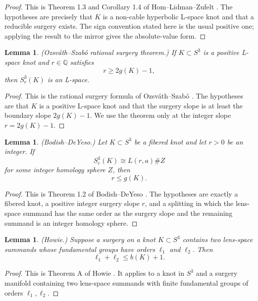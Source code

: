 \documentclass[12pt]{article}
\newtheorem{lemma}[theorem]{Lemma}
\theoremstyle{definition}
\begin{document}
\begin{proof}
This is Theorem 1.3 and Corollary 1.4 of Hom--Lidman--Zufelt \cite{HLZ}.  The hypotheses are precisely that \(K\) is a non-cable hyperbolic L-space knot and that a reducible surgery exists.  The sign convention stated here is the usual positive one; applying the result to the mirror gives the absolute-value form.
\end{proof}

\begin{lemma}\label{lem:OSz-lspace-slope}
(Ozsváth--Szabó rational surgery theorem.)  If \(K\subset S^3\) is a positive L-space knot and \(r\in\mathbb{Q}\) satisfies
\[
r\ge 2g(K)-1,
\]
then \(S^3_r(K)\) is an L-space.
\end{lemma}

\begin{proof}
This is the rational surgery formula of Ozsváth--Szabó \cite{OSzRat}.  The hypotheses are that \(K\) is a positive L-space knot and that the surgery slope is at least the boundary slope \(2g(K)-1\).  We use the theorem only at the integer slope \(r=2g(K)-1\).
\end{proof}

\begin{lemma}\label{lem:bodish-deyeso}
(Bodish--DeYeso.)  Let \(K\subset S^3\) be a fibered knot and let \(r>0\) be an integer.  If
\[
S^3_r(K)\cong L(r,a)\# Z
\]
for some integer homology sphere \(Z\), then
\[
r\le g(K).
\]
\end{lemma}

\begin{proof}
This is Theorem 1.2 of Bodish--DeYeso \cite{BodishDeYeso}.  The hypotheses are exactly a fibered knot, a positive integer surgery slope \(r\), and a splitting in which the lens-space summand has the same order as the surgery slope and the remaining summand is an integer homology sphere.
\end{proof}

\begin{lemma}\label{lem:howie-bridge}
(Howie.)  Suppose a surgery on a knot \(K\subset S^3\) contains two lens-space summands whose fundamental groups have orders \(\ell_1\) and \(\ell_2\).  Then
\[
\ell_1+\ell_2\le b(K)+1.
\]
\end{lemma}

\begin{proof}
This is Theorem A of Howie \cite{Howie}.  It applies to a knot in \(S^3\) and a surgery manifold containing two lens-space summands with finite fundamental groups of orders \(\ell_1,\ell_2\).
\end{proof}
\end{document}
